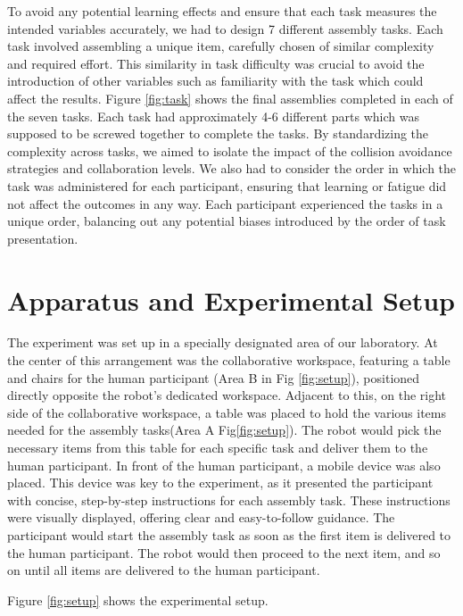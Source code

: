 To avoid any potential learning effects and ensure that each task measures the intended variables accurately, we had to design 7 different assembly tasks. Each task involved assembling a unique item, carefully chosen of similar complexity and required effort. This similarity in task difficulty was crucial to avoid the introduction of other variables such as familiarity with the task which could affect the results. Figure \ref{fig:task} shows the final assemblies completed in each of the seven tasks. Each task had approximately 4-6 different parts which was supposed to be screwed together to complete the tasks. By standardizing the complexity across tasks, we aimed to isolate the impact of the collision avoidance strategies and collaboration levels. We also had to consider the order in which the task was administered for each participant, ensuring that learning or fatigue did not affect the outcomes in any way. Each participant experienced the tasks in a unique order, balancing out any potential biases introduced by the order of task presentation. 


\section{Apparatus and Experimental Setup} \label{sec:expprot}
The experiment was set up in a specially designated area of our laboratory. At the center of this arrangement was the collaborative workspace, featuring a table and chairs for the human participant (Area B in Fig \ref{fig:setup}), positioned directly opposite the robot's dedicated workspace. Adjacent to this, on the right side of the collaborative workspace, a table was placed to hold the various items needed for the assembly tasks(Area A Fig\ref{fig:setup}). The robot would pick the necessary items from this table for each specific task and deliver them to the human participant. In front of the human participant, a mobile device was also placed. This device was key to the experiment, as it presented the participant with concise, step-by-step instructions for each assembly task. These instructions were visually displayed, offering clear and easy-to-follow guidance. The participant would start the assembly task as soon as the first item is delivered to the human participant. The robot would then proceed to the next item, and so on until all items are delivered to the human participant.

Figure \ref{fig:setup} shows the experimental setup. 

 

